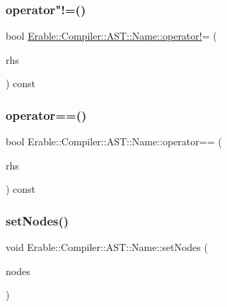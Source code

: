 \mbox{\label{class_erable_1_1_compiler_1_1_a_s_t_1_1_name_a9ece316c8aa0b9359b5d57b8c9a4b7c1}} 
\subsubsection{\texorpdfstring{operator"!=()}{operator!=()}}
{\footnotesize\ttfamily bool \mbox{\hyperlink{_old___symbols_8cpp_a97d4f78b45720ac94460bcecd041ac57}{Erable\+::\+Compiler\+::\+A\+S\+T\+::\+Name\+::operator!}}= (\begin{DoxyParamCaption}\item[{const \mbox{\hyperlink{class_erable_1_1_compiler_1_1_a_s_t_1_1_name}{Name}} \&}]{rhs }\end{DoxyParamCaption}) const}

\mbox{\label{class_erable_1_1_compiler_1_1_a_s_t_1_1_name_aa26d24be67e4c1360beecb7a915fe8e9}} 
\subsubsection{\texorpdfstring{operator==()}{operator==()}}
{\footnotesize\ttfamily bool Erable\+::\+Compiler\+::\+A\+S\+T\+::\+Name\+::operator== (\begin{DoxyParamCaption}\item[{const \mbox{\hyperlink{class_erable_1_1_compiler_1_1_a_s_t_1_1_name}{Name}} \&}]{rhs }\end{DoxyParamCaption}) const}

\mbox{\label{class_erable_1_1_compiler_1_1_a_s_t_1_1_name_aba0ba38b3634e3298525d9417dc57bb7}} 
\subsubsection{\texorpdfstring{setNodes()}{setNodes()}}
{\footnotesize\ttfamily void Erable\+::\+Compiler\+::\+A\+S\+T\+::\+Name\+::set\+Nodes (\begin{DoxyParamCaption}\item[{const std\+::vector$<$ \mbox{\hyperlink{struct_erable_1_1_compiler_1_1_a_s_t_1_1_name_node}{Name\+Node}} $>$ \&}]{nodes }\end{DoxyParamCaption})}



